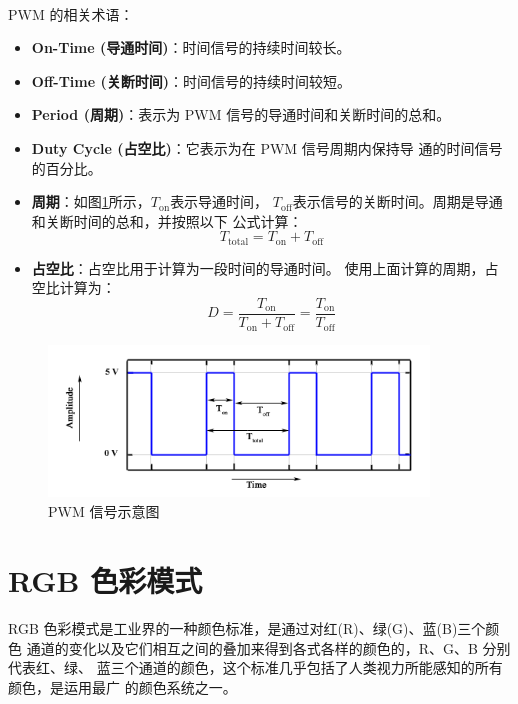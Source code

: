 \documentclass[UTF8, oneside]{ctexbook}
\begin{document}
\paragraph{}
PWM 的相关术语：
\begin{itemize}
    \item[(1)] \textbf{On-Time (导通时间)}：时间信号的持续时间较长。
    \item[(2)] \textbf{Off-Time (关断时间)}：时间信号的持续时间较短。
    \item[(3)] \textbf{Period (周期)}：表示为 PWM 信号的导通时间和关断时间的总和。
    \item[(4)] \textbf{Duty Cycle (占空比)}：它表示为在 PWM 信号周期内保持导
    通的时间信号的百分比。
    \item[(5)] \textbf{周期}：如图\ref{pwm}所示，$T_{\text{on}}$表示导通时间，
    $T_{\text{off}}$表示信号的关断时间。周期是导通和关断时间的总和，并按照以下
    公式计算：
    \begin{equation*}
        T_{\text{total}}=T_{\text{on}}+T_{\text{off}}
    \end{equation*} 
    \item[(6)] \textbf{占空比}：占空比用于计算为一段时间的导通时间。
    使用上面计算的周期，占空比计算为：
    \begin{equation*}
        D = \frac{T_{\text{on}}}{T_{\text{on}}+T_{\text{off}}} = \frac{T_{\text{on}}}{T_{\text{off}}}
    \end{equation*}
\end{itemize}
\begin{figure}[h]
    \centering
    \includegraphics[width=0.9\textwidth]{./result/basic/3/pwm.jpg}
    \caption{PWM 信号示意图}
    \label{pwm}
\end{figure}

\section{RGB 色彩模式}
\paragraph{}
RGB 色彩模式是工业界的一种颜色标准，是通过对红(R)、绿(G)、蓝(B)三个颜色
通道的变化以及它们相互之间的叠加来得到各式各样的颜色的，R、G、B 分别代表红、绿、
蓝三个通道的颜色，这个标准几乎包括了人类视力所能感知的所有颜色，是运用最广
的颜色系统之一。
\end{document}
